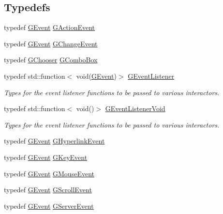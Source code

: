 \subsection*{Typedefs}
\begin{DoxyCompactItemize}
\item 
typedef \mbox{\hyperlink{classsgl_1_1GEvent}{G\+Event}} \mbox{\hyperlink{namespacesgl_abbab10d11acd87e0046234a348fde918}{G\+Action\+Event}}
\item 
typedef \mbox{\hyperlink{classsgl_1_1GEvent}{G\+Event}} \mbox{\hyperlink{namespacesgl_a382e59effeebd97a6937d03aac1a9473}{G\+Change\+Event}}
\item 
typedef \mbox{\hyperlink{classsgl_1_1GChooser}{G\+Chooser}} \mbox{\hyperlink{namespacesgl_ab0f3b803fb5fee40d956ceafc1c1c162}{G\+Combo\+Box}}
\item 
typedef std\+::function$<$ void(\mbox{\hyperlink{classsgl_1_1GEvent}{G\+Event}})$>$ \mbox{\hyperlink{namespacesgl_ae9f3e9eab70035da1a2b114e21357b25}{G\+Event\+Listener}}
\begin{DoxyCompactList}\small\item\em Types for the event listener functions to be passed to various interactors. \end{DoxyCompactList}\item 
typedef std\+::function$<$ void()$>$ \mbox{\hyperlink{namespacesgl_a54427ce97bb1c2804e4fe2b0a62e8b17}{G\+Event\+Listener\+Void}}
\begin{DoxyCompactList}\small\item\em Types for the event listener functions to be passed to various interactors. \end{DoxyCompactList}\item 
typedef \mbox{\hyperlink{classsgl_1_1GEvent}{G\+Event}} \mbox{\hyperlink{namespacesgl_a4cc871eb91ac48c4d61ecb1dca7dc927}{G\+Hyperlink\+Event}}
\item 
typedef \mbox{\hyperlink{classsgl_1_1GEvent}{G\+Event}} \mbox{\hyperlink{namespacesgl_aaec92bb2be006a719c0e61b6acaeea78}{G\+Key\+Event}}
\item 
typedef \mbox{\hyperlink{classsgl_1_1GEvent}{G\+Event}} \mbox{\hyperlink{namespacesgl_a0bc653774bff0fd137896d1cafcf8fb9}{G\+Mouse\+Event}}
\item 
typedef \mbox{\hyperlink{classsgl_1_1GEvent}{G\+Event}} \mbox{\hyperlink{namespacesgl_ada87e79f7baf505db50191dd8f72f07b}{G\+Scroll\+Event}}
\item 
typedef \mbox{\hyperlink{classsgl_1_1GEvent}{G\+Event}} \mbox{\hyperlink{namespacesgl_aa79f98272dc4f07892e41470d23293b2}{G\+Server\+Event}}

\end{DoxyCompactItemize}
